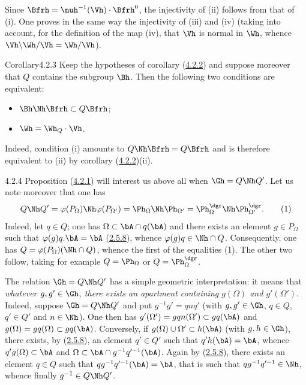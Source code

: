 \documentclass[12pt,a4paper,oneside,english]{smfart}
\makeatletter
\newcommand{\btanchor}[1]{\leavevmode\Hy@raisedlink{\hypertarget{bt:#1}{}}}
\newcommand{\btref}[1]{\hyperlink{bt:#1}{#1}}
\theoremstyle{definition}
\theoremstyle{bt}
\makeatother
\begin{document}
Since $\Bfrh = \nuh^{-1}(\Vh)\cdot\Bfrh^{0}$, the injectivity of (ii) follows
from that of (i). One proves in the same way the injectivity of (iii) and
(iv) (taking into account, for the definition of the map (iv), that $\Vh$ is
normal in $\Wh$, whence $\Vh\backslash\Wh/\Vh = \Wh/\Vh$).

\begin{state}{Corollary}{4.2.3}\btanchor{4.2.3}
Keep the hypotheses of corollary (\btref{4.2.2}) and suppose moreover that $Q$
contains the subgroup $\Bh$. Then the following two conditions are
equivalent:
\begin{itemize}
\item[(i)] $\Bh\Nh\Bfrh \subset Q\Bfrh$;
\item[(ii)] $\Wh = \Wh_{Q}\cdot\Vh$.
\end{itemize}
\end{state}

Indeed, condition (i) amounts to $Q\Nh\Bfrh = Q\Bfrh$ and is therefore
equivalent to (ii) by corollary (\btref{4.2.2})(ii).

\num{4.2.4}\btanchor{4.2.4}
Proposition (\btref{4.2.1}) will interest us above all when $\Gh = Q\Nh Q'$. Let us
note moreover that one has
\begin{equation}
Q\Nh Q' = \varphi(P_{\Omega})\Nh\varphi(P_{\Omega'})
        = \Ph_{\Omega}\Nh\Ph_{\Omega'}
        = \Ph^{\dgr}_{\Omega}\Nh\Ph^{\dgr}_{\Omega'} . \tag{1}
\end{equation}
Indeed, let $q\in Q$; one has $\Omega\subset\bA\cap q(\bA)$ and there exists
an element $g \in P_{\Omega}$ such that $\varphi(g)q.\bA = \bA$ (\btref{2.5.8}),
whence $\varphi(g)q \in \Nh\cap Q$. Consequently, one has
$Q = \varphi(P_{\Omega})(\Nh\cap Q)$, whence the first of the equalities (1).
The other two follow, taking for example $Q = \Ph_{\Omega}$ or
$Q = \Ph^{\dgr}_{\Omega}$.

The relation $\Gh = Q\Nh Q'$ has a simple geometric interpretation: it means
that \emph{whatever $g, g'\in\Gh$, there exists an apartment containing
$g(\Omega)$ and $g'(\Omega')$}. Indeed, suppose $\Gh = Q\Nh Q'$ and put
$g^{-1}g' = qnq'$ (with $g,g'\in\Gh$, $q\in Q$, $q'\in Q'$ and $n\in\Nh$).
One then has $g'(\Omega') = gqn(\Omega')\subset gq(\bA)$ and
$g(\Omega) = gq(\Omega)\subset gq(\bA)$. Conversely, if
$g(\Omega)\cup\Omega' \subset h(\bA)$ (with $g,h\in\Gh$), there exists, by
(\btref{2.5.8}), an element $q'\in Q'$ such that $q'h(\bA) = \bA$, whence
$q'g(\Omega)\subset\bA$ and $\Omega \subset \bA\cap g^{-1}q'^{-1}(\bA)$.
Again by (\btref{2.5.8}), there exists an element $q\in Q$ such that
$qg^{-1}q'^{-1}(\bA) = \bA$, that is such that $qg^{-1}q'^{-1}\in\Nh$, whence
finally $g^{-1} \in Q\Nh Q'$.
\end{document}
